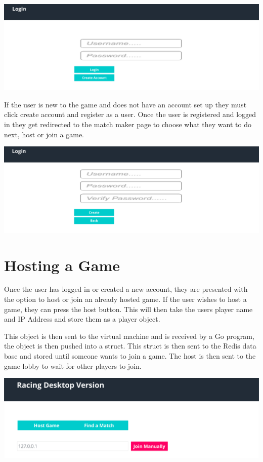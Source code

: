 \includegraphics[width=1\columnwidth]{img/LoginActual.PNG}

 If the user is new to the game and does not have an account set up they must click create account and register as a user. Once the user is registered and logged in they get redirected to the match maker page to choose what they want to do next, host or join a game. 
\newline

\includegraphics[width=1\columnwidth]{img/CreateAccountActual.PNG}

\section{Hosting a Game}
Once the user has logged in or created a new account, they are presented with the option to host or join an already hosted game. If the user wishes to host a game, they can press the host button. This will then take the users player name and IP Address and store them as a player object.
\newline

This object is then sent to the virtual machine and is received by a Go program, the object is then pushed into a struct. This struct is then sent to the Redis data base and stored until someone wants to join a game. The host is then sent to the game lobby to wait for other players to join. 
\newline

\includegraphics[width=1\columnwidth]{img/MatchFinder1Actual.PNG}

